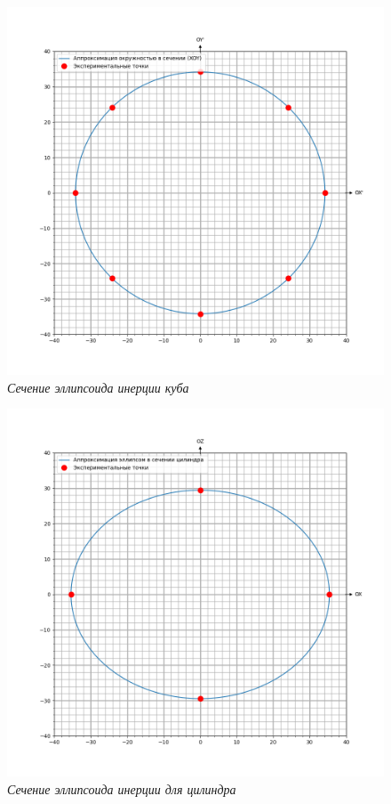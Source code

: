 \documentclass[a4paper,12pt]{article}
\begin{document}
\begin{figure}[h!]
    \includegraphics[width=1\textwidth]{cube-ell.png}
    \caption{\textit{Сечение эллипсоида инерции куба}}
    \label{cube-ell}
\end{figure}

\begin{figure}[h!]
    \includegraphics[width=1\textwidth]{cil.png}
    \caption{\textit{Сечение эллипсоида инерции для цилиндра}}
    \label{cil-ell}
\end{figure}
\end{document}
